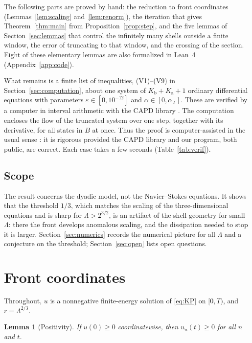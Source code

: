 \documentclass[12pt,reqno]{amsart}
\numberwithin{equation}{section}
\theoremstyle{plain}
\newtheorem{lemma}[theorem]{Lemma}
\theoremstyle{definition}
\theoremstyle{remark}
\newcommand{\Kb}{K_{\mathrm b}}
\newcommand{\Ka}{K_{\mathrm a}}
\newcommand{\eps}{\varepsilon}
\begin{document}
The following parts are proved by hand: the reduction to front
coordinates (Lemmas~\ref{lem:scaling} and~\ref{lem:renorm}), the
iteration that gives Theorem~\ref{thm:main} from
Proposition~\ref{prop:step}, and the five lemmas of
Section~\ref{sec:lemmas} that control the infinitely many shells outside a
finite window, the error of truncating to that window, and the crossing
of the section. Eight of these elementary lemmas are also formalized in
Lean~4 (Appendix~\ref{app:code}).

What remains is a finite list of inequalities, (V1)--(V9) in
Section~\ref{sec:computation}, about one system of $\Kb+\Ka+1$ ordinary
differential equations with parameters $\eps\in[0,10^{-12}]$ and
$\alpha\in[0,\alpha_\Lambda]$. These are verified by a computer in interval
arithmetic with the CAPD library \cite{CAPD21,Zgl02}. The computation
encloses the flow of the truncated system over one step, together with
its derivative, for all states in $B$ at once. Thus the proof is
computer-assisted in the usual sense \cite{GS19}: it is rigorous provided
the CAPD library and our program, both public, are correct. Each case
takes a few seconds (Table~\ref{tab:verif}).

\subsection{Scope}
The result concerns the dyadic model, not the Navier--Stokes equations.
It shows that the threshold $1/3$, which matches the scaling of the
three-dimensional equations and is sharp for $\Lambda>2^{3/2}$, is an
artifact of the shell geometry for small $\Lambda$: there the front
develops anomalous scaling, and the dissipation needed to stop it is
larger. Section~\ref{sec:numerics} records the numerical picture for all
$\Lambda$ and a conjecture on the threshold; Section~\ref{sec:open} lists open
questions.

\section{Front coordinates}\label{sec:front}

Throughout, $u$ is a nonnegative finite-energy solution of \eqref{eq:KP} on
$[0,T)$, and $r=\Lambda^{2/3}$.

\begin{lemma}[Positivity]\label{lem:pos}
If $u(0)\ge0$ coordinatewise, then $u_n(t)\ge0$ for all $n$ and $t$.
\end{lemma}
\end{document}
